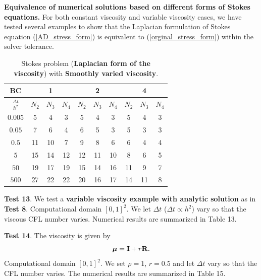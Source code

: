 \documentclass[9pt]{article}
\newcommand{\V}[1]{\boldsymbol{#1}}
\begin{document}
{\bf Equivalence of numerical solutions based on different forms of Stokes equations.} For both constant viscosity and variable viscosity cases, we have tested several examples to show that the Laplacian formulation of Stokes equation (\ref{AD_stress_form}) is equivalent to (\ref{orginal_stress_form}) within the solver tolerance.


\begin{table}[h]
\begin{center}
\begin{tabular}{|c||ccc|ccc|ccc|}
\hline
 BC      &    &1     &   &   &2     &    &    &4     & \\
\hline
$\frac{\Delta t}{h^2}$  &$N_2$ &$N_3$  &$N_4$  &$N_2$ &$N_3$  &$N_4$  &$N_2$  &$N_3$  &$N_4$ \\
\hline
\hline
$0.005$    &5    &4   &3     &5  &4  &3     &5    &4   &3 \\
\hline
$0.05$     &7    &6   &4     &6  &5  &3     &5    &3   &3 \\
\hline
$0.5$     &11   &10   &7     &9  &8  &6     &6    &4   &4 \\
\hline
$5$       &15   &14  &12    &12  &11 &10    &8    &6   &5 \\
\hline
$50$      &19   &17  &19    &15  &14 &16   &11    &9   &7 \\
\hline
$500$     &27   &22  &22    &20  &16 &17   &14   &11   &8 \\
\hline
\end{tabular}
\vspace{2mm} \caption{Stokes problem ({\bf Laplacian form of the viscosity}) with {\bf Smoothly varied viscosity}.
}
\end{center}
\end{table}
{\bf Test 13}. We test a {\bf variable viscosity example with analytic solution} as in {\bf Test 8}.%
Computational domain $[0, 1]^2$. We let $\Delta t$ ($\Delta t  \propto {h^2}$) vary so that the viscous CFL number varies.
Numerical results are summarized in Table 13.

{\bf Test 14}. The viscosity is given by
$$
{\V{\mu}}  = {\bf I}+ r {\bf R}.
$$
Computational domain $[0, 1]^2$. We set $\rho=1$, $r=0.5$ and let $\Delta t$ vary so that the CFL number varies. The numerical results are summarized in Table 15.
\end{document}
